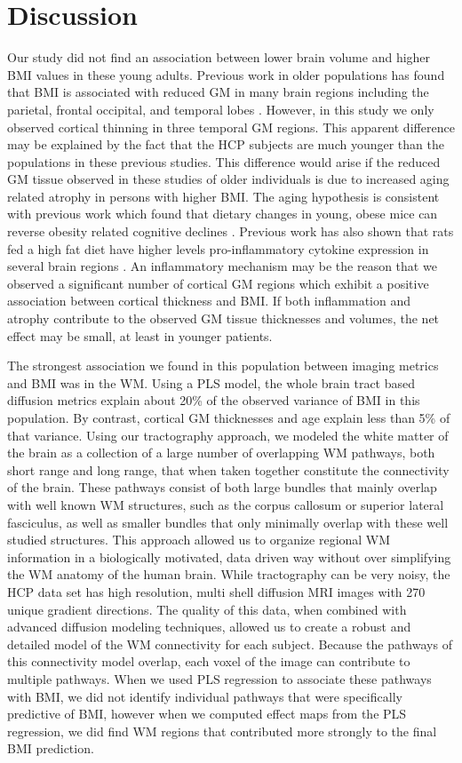 \section{Discussion}

Our study did not find an association between lower brain volume and higher BMI values in these young adults. Previous work in older populations has found that BMI is associated with reduced GM in many brain regions including the parietal, frontal occipital, and temporal lobes \cite{Ho_2010,Raji_2009}. However, in this study we only observed cortical thinning in three temporal GM regions. This apparent difference may be explained by the fact that the HCP subjects are much younger than the populations in these previous studies. This difference would arise if the reduced GM tissue observed in these studies of older individuals is due to increased aging related atrophy in persons with higher BMI. The aging hypothesis is consistent with previous work which found that dietary changes in young, obese mice can reverse obesity related cognitive declines \cite{Sims_Robinson_2016}. Previous work has also shown that rats fed a high fat diet have higher levels pro-inflammatory cytokine expression in several brain regions \cite{Boitard_2014}. An inflammatory mechanism may be the reason that we observed a significant number of cortical GM regions which exhibit a positive association between cortical thickness and BMI. If both inflammation and atrophy contribute to the observed GM tissue thicknesses and volumes, the net effect may be small, at least in younger patients.

The strongest association we found in this population between imaging metrics and BMI was in the WM. Using a PLS model, the whole brain tract based diffusion metrics explain about 20\% of the observed variance of BMI in this population. By contrast, cortical GM thicknesses and age explain less than 5\% of that variance. Using our tractography approach, we modeled the white matter of the brain as a collection of a large number of overlapping WM pathways, both short range and long range, that when taken together constitute the connectivity of the brain. These pathways consist of both large bundles that mainly overlap with well known WM structures, such as the corpus callosum or superior lateral fasciculus, as well as smaller bundles that only minimally overlap with these well studied structures. This approach allowed us to organize regional WM information in a biologically motivated, data driven way without over simplifying the WM anatomy of the human brain. While tractography can be very noisy, the HCP data set has high resolution, multi shell diffusion MRI images with 270 unique gradient directions. The quality of this data, when combined with advanced diffusion modeling techniques, allowed us to create a robust and detailed model of the WM connectivity for each subject. Because the pathways of this connectivity model overlap, each voxel of the image can contribute to multiple pathways. When we used PLS regression to associate these pathways with BMI, we did not identify individual pathways that were specifically predictive of BMI, however when we computed effect maps from the PLS regression, we did find WM regions that contributed more strongly to the final BMI prediction.   


